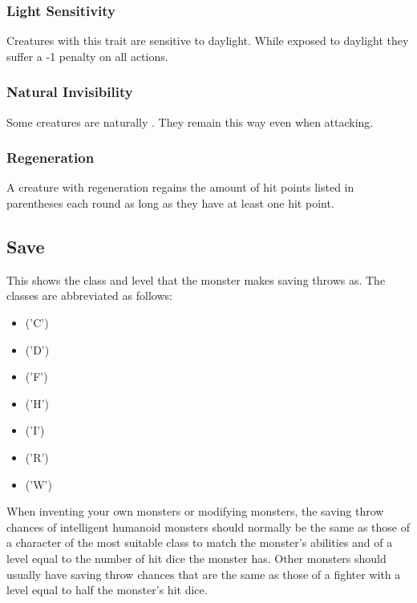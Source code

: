 \begin{multicols*}{2}
\subsubsection{Light Sensitivity}
Creatures with this trait are sensitive to daylight. While exposed to daylight they suffer a -1 penalty on all actions.

\subsubsection{Natural Invisibility}
Some creatures are naturally . They remain this way even when attacking.

\subsubsection{Regeneration}
A creature with regeneration regains the amount of hit points listed in parentheses each round as long as they have at least one hit point.

\subsection{Save}
This shows the class and level that the monster makes saving throws as. The classes are abbreviated as follows:

\begin{itemize}
	\item{ ('C')}
	\item{ ('D')}
	\item{ ('F')}
	\item{ ('H')}
	\item{ ('I')}
	\item{ ('R')}
	\item{ ('W')}
\end{itemize}

When inventing your own monsters or modifying monsters, the saving throw chances of intelligent humanoid monsters should normally be the same as those of a character of the most suitable class to match the monster’s abilities and of a level equal to the number of hit dice the monster has. Other monsters should usually have saving throw chances that are the same as those of a fighter with a level equal to half the monster’s hit dice.


\end{multicols*}
